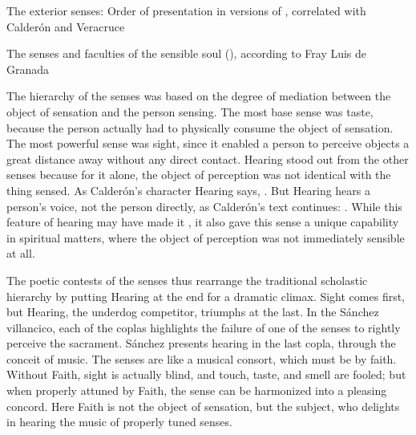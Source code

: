 \begin{table}
  \caption{The exterior senses: Order of presentation in versions of , correlated with Calderón and Veracruce}
  \label{table:senses-order}
\end{table}


\begin{table}
  \caption{The senses and faculties of the sensible soul (), according to Fray Luis de Granada}
  \label{table:senses-fray-luis}
\end{table}

The hierarchy of the senses was based on the degree of mediation between the object of sensation and the person sensing.
The most base sense was taste, because the person actually had to physically consume the object of sensation.
The most powerful sense was sight, since it enabled a person to perceive objects a great distance away without any direct contact.
Hearing stood out from the other senses because for it alone, the object of perception was not identical with the thing sensed.
As Calderón's character Hearing says, .%
\autocite[]{Calderon:Retiro}
But Hearing hears a person's voice, not the person directly, as Calderón's text continues: .%
\autocite[]{Calderon:Retiro}
While this feature of hearing may have made it , it also gave this sense a unique capability in spiritual matters, where the object of perception was not immediately sensible at all.

The poetic contests of the senses thus rearrange the traditional scholastic hierarchy by putting Hearing at the end for a dramatic climax.
Sight comes first, but Hearing, the underdog competitor, triumphs at the last.
In the Sánchez villancico, each of the coplas highlights the failure of one of the senses to rightly perceive the sacrament.
Sánchez presents hearing in the last copla, through the conceit of music.
The senses are  like a musical consort, which must be  by faith.
Without Faith, sight is actually blind, and touch, taste, and smell are fooled; but when properly attuned by Faith, the sense can be harmonized into a pleasing concord.
Here Faith is not the object of sensation, but the subject, who delights in hearing the music of properly tuned senses.

